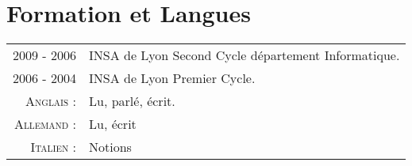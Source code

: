 \documentclass[a4paper,10pt]{article}
\begin{document}
\section{Formation et Langues}
\begin{tabular}{rl}
  \textsc{2009 - 2006}  & INSA de Lyon Second Cycle département Informatique.         \\
  \textsc{2006 - 2004}  & INSA de Lyon Premier Cycle.                                 \\
  \textsc{Anglais :}    & Lu, parlé, écrit.                                           \\
  \textsc{Allemand :}   & Lu, écrit                                                   \\
  \textsc{Italien :}    & Notions                                                     \\
\end{tabular}
\\
\end{document}
